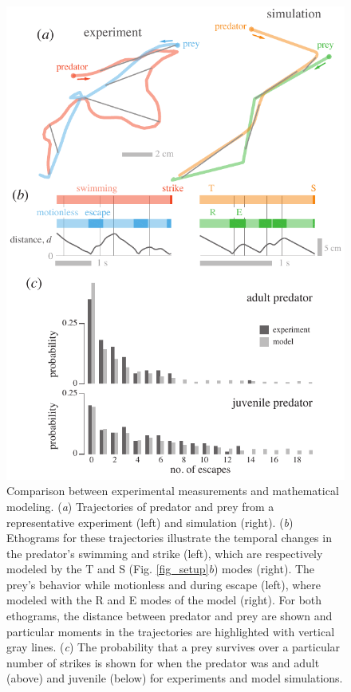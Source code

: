 \documentclass[]{rsos}%
\begin{document}
\pagebreak

\pagebreak

\begin{figure}[!h]
\centering
	\includegraphics[width=4.5in]{fig_trajectories}
\caption{Comparison between experimental measurements and mathematical modeling. 
(\textit{a}) Trajectories of predator and prey from a representative experiment (left) and simulation (right).
(\textit{b}) Ethograms for these trajectories illustrate the temporal changes in the predator's swimming and strike (left), which are respectively modeled by the T and S (Fig. \ref{fig_setup}\textit{b}) modes (right). 
The prey's behavior while motionless and during escape (left), where modeled with the R and E modes of the model (right).
For both ethograms, the distance between predator and prey are shown and particular moments in the trajectories are highlighted with vertical gray lines.
(\textit{c}) The probability that a prey survives over a particular number of strikes is shown for when the predator was and adult (above) and juvenile (below) for experiments and model simulations.   
}
\label{fig_traj}
\end{figure}
\end{document}
